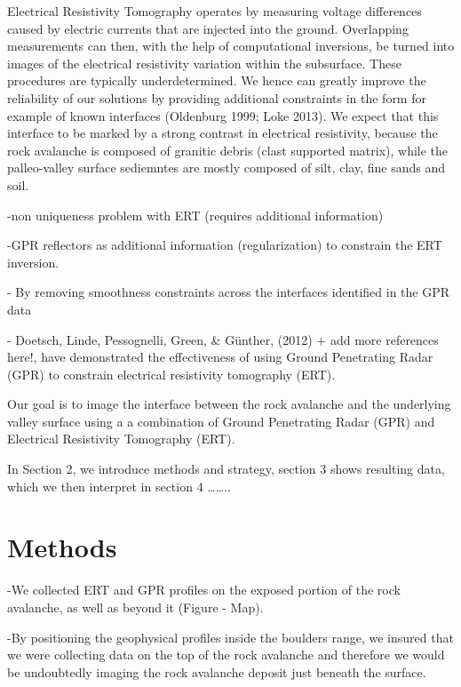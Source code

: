 \documentclass[5p]{elsarticle}
\begin{document}
Electrical Resistivity Tomography operates by measuring voltage differences caused by electric currents that are injected into the ground. Overlapping measurements can then, with the help of computational inversions, be turned into images of the electrical resistivity variation within the subsurface. These procedures are typically underdetermined. We hence can greatly improve the reliability of our solutions by providing additional constraints in the form for example of known interfaces (Oldenburg 1999; Loke 2013). We expect that this interface to be marked by a strong contrast in electrical resistivity, because the rock avalanche is composed of granitic debris (clast supported matrix), while the palleo-valley surface sediemntes are mostly composed of silt, clay, fine sands and soil. 

-non uniqueness problem with ERT (requires additional information)

-GPR reflectors as additional information (regularization) to constrain the ERT inversion.


- By removing smoothness constraints across the interfaces identified in the GPR data 


- Doetsch, Linde, Pessognelli, Green, & Günther, (2012) + add more references here!, have demonstrated the effectiveness of using Ground Penetrating Radar (GPR) to constrain electrical resistivity tomography (ERT).


Our goal is to image the interface between the rock avalanche and the underlying valley surface using a a combination of Ground Penetrating Radar (GPR) and Electrical Resistivity Tomography (ERT).

In Section 2, we introduce methods and strategy, section 3 shows resulting data, which we then interpret in section 4 ……..
\bigskip   





\section{Methods}

-We collected ERT and GPR profiles on the exposed portion of the rock avalanche, as well as beyond it (Figure - Map). 

-By positioning the geophysical profiles inside the boulders range, we insured that we were collecting data on the top of the rock avalanche and therefore we would be undoubtedly imaging the rock avalanche deposit just beneath the surface.
\end{document}
